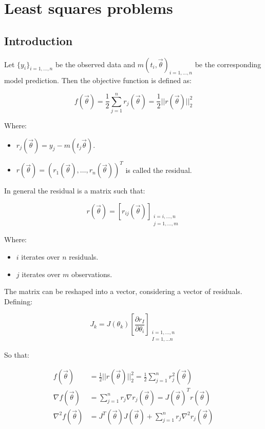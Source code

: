 \graphicspath{{chapters/10/images/}}
\chapter{Least squares problems}

\section{Introduction}
Let $\{y_i\}_{i = 1, \dots, n}$ be the observed data and $m(t_i, \vec{\theta})_{i = 1, \dots, n}$ be the corresponding model prediction.
Then the objective function is defined as:

$$f(\vec{\theta}) = \frac{1}{2}\sum\limits_{j = 1}^nr_j(\vec{\theta}) = \frac{1}{2}||r(\vec{\theta})||_2^2$$

Where:

\begin{multicols}{2}
  \begin{itemize}
    \item $r_j(\vec{\theta}) = y_j-m(t_j \vec{\theta})$.
    \item $r(\vec{\theta}) = (r_1(\vec{\theta}), \dots, r_n(\vec{\theta}))^T$ is called the residual.
  \end{itemize}
\end{multicols}

In general the residual is a matrix such that:

$$r(\vec{\theta}) = [r_{ij}(\vec{\theta})]_{\substack{i = i, \dots, n\\j = 1, \dots, m}}$$

Where:

\begin{multicols}{2}
  \begin{itemize}
    \item $i$ iterates over $n$ residuals.
    \item $j$ iterates over $m$ observations.
  \end{itemize}
\end{multicols}

The matrix can be reshaped into a vector, considering a vector of residuals.
Defining:

$$J_k=J(\theta_k)\left[\frac{\partial r_I}{\partial\theta_i}\right]_{\substack{i=1, ...,n\\ I=1,...n}}$$

So that:

\begin{align*}
  f(\vec{\theta}) &= \frac{1}{2}||r(\vec{\theta})||_2^2 = \frac{1}{2}\sum\limits_{j=1}^nr_j^2(\vec{\theta})\\
  \nabla f(\vec{\theta}) &= \sum\limits_{j=1}^nr_j\nabla r_j(\vec{\theta}) = J(\vec{\theta})^Tr(\vec{\theta})\\
  \nabla^2 f(\vec{\theta}) &= J^T(\vec{\theta})J(\vec{\theta}) + \sum\limits_{j=1}^nr_j\nabla^2 r_j(\vec{\theta})
\end{align*}

